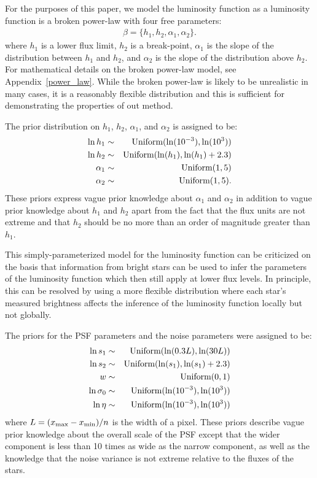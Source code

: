\documentclass[12pt, preprint]{aastex}
\begin{document}
For the purposes of this paper, we model the luminosity function as a
luminosity function is a broken power-law with four
free parameters:
\begin{eqnarray}
\beta = \{h_1, h_2, \alpha_1, \alpha_2\}.
\end{eqnarray}
where $h_1$ is a lower flux limit, $h_2$ is a break-point, $\alpha_1$ is
the slope of the distribution between $h_1$ and $h_2$, and $\alpha_2$ is the
slope of the distribution above $h_2$. For mathematical details on the broken power-law
model, see Appendix~\ref{power_law}. While the broken power-law is likely to be
unrealistic in many cases, it is a reasonably flexible distribution and this is
sufficient for demonstrating the properties of out method.

The prior distribution on $h_1$, $h_2$,
$\alpha_1$, and $\alpha_2$ is assigned to be:
\begin{eqnarray}
\ln h_1 &\sim& \textnormal{Uniform}(\ln(10^{-3}), \ln(10^3)) \\
\ln h_2 &\sim& \textnormal{Uniform}(\ln(h_1), \ln(h_1) + 2.3) \\
\alpha_1 &\sim& \textnormal{Uniform}(1, 5) \\
\alpha_2 &\sim& \textnormal{Uniform}(1, 5).
\end{eqnarray}
These priors express vague prior knowledge about $\alpha_1$ and $\alpha_2$ in
addition to vague prior knowledge about $h_1$ and $h_2$ apart from the fact
that the flux units are not extreme and that $h_2$ should be no more than an
order of magnitude greater than $h_1$.

This simply-parameterized model for the luminosity function can be criticized
on the basis that information from bright stars can be used to infer the
parameters of the luminosity function which then still apply at lower flux
levels. In principle, this can be resolved by using a more flexible distribution
\citep[e.g.][]{2008ApJ...682..874K} where each star's measured brightness
affects the inference of the luminosity function locally but not globally.

The priors for the PSF parameters and the noise parameters were assigned to be:
\begin{eqnarray}
\ln s_1 &\sim& \textnormal{Uniform}(\ln(0.3L), \ln(30L)) \\
\ln s_2 &\sim& \textnormal{Uniform}(\ln(s_1), \ln(s_1) + 2.3) \\
w &\sim& \textnormal{Uniform}(0, 1)\\
\ln \sigma_0 &\sim& \textnormal{Uniform}(\ln(10^{-3}), \ln(10^{3})) \\
\ln \eta &\sim& \textnormal{Uniform}(\ln(10^{-3}), \ln(10^{3}))
\end{eqnarray}
where $L = (x_{\rm max} - x_{\rm min})/n$ is the width of a pixel. These priors
describe vague prior knowledge about the overall scale of the PSF except that the
wider component is less than 10 times as wide as the narrow component, as well
as the knowledge that the noise variance is not extreme relative to the fluxes
of the stars.
\end{document}
